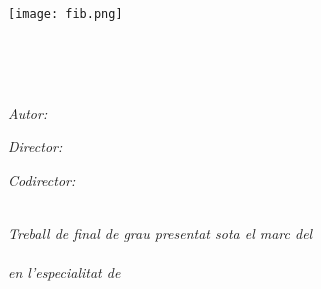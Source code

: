 \documentclass[
11pt, %
catalan, %
singlespacing, %
headsepline, %
table
]{MastersDoctoralThesis} %
\author{Joaquim \textsc{Motger de la Encarnación}} %
\begin{document}
\frontmatter %

\pagestyle{plain} %


\begin{titlepage}
\begin{center}

\texttt{[image: fib.png]}\vspace{4.0cm} %

\HRule \\[0.4cm] %
{\huge \bfseries \ttitle\par}\vspace{0.4cm} %
\HRule \\[1.5cm] %
 
\begin{minipage}[t]{0.4\textwidth}
\begin{flushleft} \large
\emph{Autor:}\\
\href{}{\authorname} %
\end{flushleft}
\end{minipage}
\begin{minipage}[t]{0.4\textwidth}
\begin{flushright} \large
\emph{Director:} \\
\href{}{\supname} %
\end{flushright}
\begin{flushright} \large
\emph{Codirector:} \\
\href{}{\examname} %
\end{flushright}
\end{minipage}\\[6cm]
 

\large \textit{Treball de final de grau presentat sota el marc del}\\[0.3cm] %
\degreename\\[0.5cm]
\textit{en l'especialitat de}\\[0.3cm]
\groupname\\[2cm] %
 
 
\vfill
\end{center}
\end{titlepage}
\end{document}
